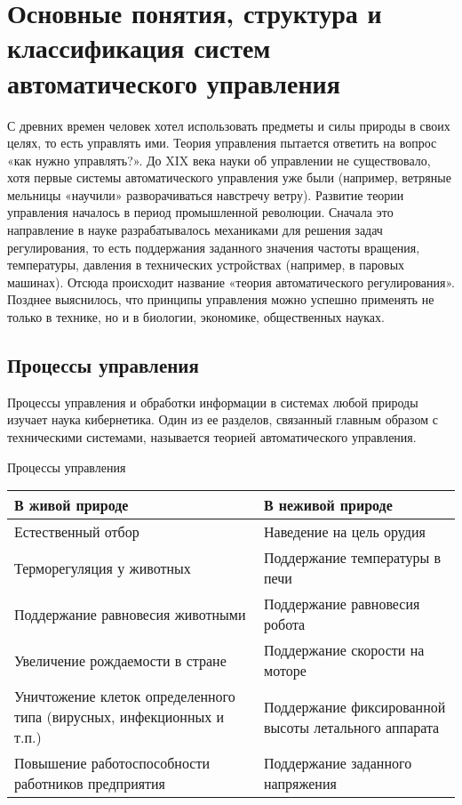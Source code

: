 \documentclass[TAU.tex]{subfiles}
\begin{document}
\chapter{Основные понятия, структура и классификация систем автоматического управления}

С древних времен человек хотел использовать предметы и силы природы в своих целях, то есть управлять ими. Теория управления пытается ответить на вопрос «как нужно управлять?». До XIX века науки об управлении не существовало, хотя первые системы автоматического управления уже были (например, ветряные мельницы «научили» разворачиваться навстречу ветру). Развитие теории управления началось в период промышленной революции. Сначала это направление в науке разрабатывалось механиками для решения задач регулирования, то есть поддержания заданного значения частоты вращения, температуры, давления в технических устройствах (например, в паровых машинах). Отсюда происходит название «теория автоматического регулирования». Позднее выяснилось, что принципы управления можно успешно применять не только в технике, но и в биологии, экономике, общественных науках.

\section {Процессы управления}

Процессы управления и обработки информации в системах любой природы изучает наука кибернетика. Один из ее разделов, связанный главным образом с техническими системами, называется теорией автоматического управления. 

\begin{center}
Процессы управления\\ [4pt]
\begin{tabular}{|p{6.5cm}|p{6.5cm}|}
  \hline
  {\Large В живой природе} & {\Large В неживой природе} \\ [4pt]
  \hline
  Естественный отбор & Наведение на цель орудия \\
  \hline
  Терморегуляция у животных & Поддержание температуры в печи\\
  \hline
  Поддержание равновесия животными & Поддержание равновесия робота\\
  \hline
  Увеличение рождаемости в стране & Поддержание скорости на моторе\\
  \hline
  Уничтожение клеток определенного типа (вирусных, инфекционных и т.п.)& Поддержание фиксированной высоты летального аппарата\\
  \hline
  Повышение работоспособности работников предприятия & Поддержание заданного напряжения\\
  \hline
\end{tabular}
\end{center}
\end{document}
